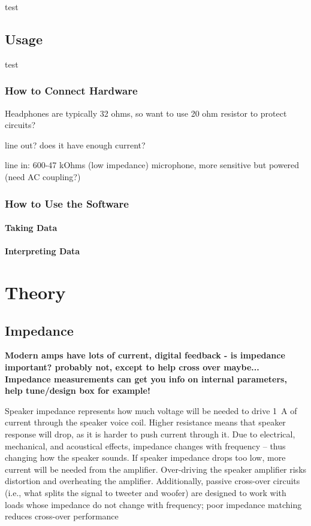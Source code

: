 \documentclass[10pt]{book}
\begin{document}
test

\chapter{Usage}
test
\section{How to Connect Hardware}
Headphones are typically 32 ohms, so want to use 20 ohm resistor to protect circuits?

line out? does it have enough current?

line in: 600-47 kOhms (low impedance)
microphone, more sensitive but powered (need AC coupling?)
\section{How to Use the Software}
\subsection{Taking Data}
\subsection{Interpreting Data}
\part{Theory}
\chapter{Impedance}\label{Impedance}
\textbf{Modern amps have lots of current, digital feedback - is impedance important? probably not, except to help cross over maybe... Impedance measurements can get you info on internal parameters, help tune/design box for example!}

Speaker impedance represents how much voltage will be needed to drive 1~A of current  through the speaker voice coil. Higher resistance means that speaker response will drop, as it is harder to push current through it. Due to electrical, mechanical, and acoustical effects, impedance changes with frequency -- thus changing how the speaker sounds. If speaker impedance drops too low, more current will be needed from the amplifier. Over-driving the speaker amplifier risks distortion and overheating the amplifier. Additionally, passive cross-over circuits (i.e., what splits the signal to tweeter and woofer) are designed to work with loads whose impedance do not change with frequency; poor impedance matching reduces cross-over performance
\end{document}
